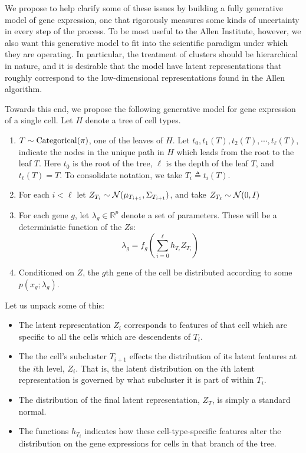 We propose to help clarify some of these issues by building a fully generative model of gene expression, one that rigorously measures some kinds of uncertainty in every step of the process.  To be most useful to the Allen Institute, however, we also want this generative model to fit into the scientific paradigm under which they are operating.  In particular, the treatment of clusters should be hierarchical in nature, and it is desirable that the model have latent representations that roughly correspond to the low-dimensional representations found in the Allen algorithm.  

Towards this end, we propose the following generative model for gene expression of a single cell.  Let $H$ denote a tree of cell types.   

\begin{enumerate}
\item $T \sim \operatorname*{Categorical}(\pi)$, one of the leaves of $H$.  Let $t_0,t_1(T),t_2(T),\cdots ,t_\ell(T)$, indicate the nodes in the unique path in $H$ which leads from the root to the leaf $T$.  Here $t_0$ is the root of the tree, $\ell$ is the depth of the leaf $T$, and $t_\ell(T)=T$.   To consolidate notation, we take $T_i \triangleq t_i(T)$.
\item For each $i<\ell$ let $Z_{T_i} \sim \mathcal{N}(\mu_{T_{i+1}},\Sigma_{T_{i+1}})$, and take $Z_{T_\ell} \sim \mathcal{N}(0,I)$
\item For each gene $g$, let $\lambda_g \in \mathbb R^{p}$ denote a set of parameters.  These will be a deterministic function of the $Z$s:
\[
\lambda_g = f_g \left(\sum_{i=0}^{\ell} h_{T_i}Z_{T_i}\right)
\]
\item Conditioned on $Z$, the  $g$th gene of the cell be distributed according to some $p(x_g ; \lambda_g)$.
\end{enumerate}

Let us unpack some of this:

\begin{itemize}
\item The latent representation $Z_i$ corresponds to features of that cell which are specific to all the cells which are descendents of $T_i$.
\item The the cell's subcluster $T_{i+1}$ effects the distribution of its latent features at the $i$th level, $Z_i$.  That is, the latent distribution on the $i$th latent representation is governed by what subcluster it is part of within $T_i$.
\item The distribution of the final latent representation, $Z_T$, is simply a standard normal.
\item The functions $h_{T_i}$ indicates how these cell-type-specific features alter the distribution on the gene expressions for cells in that branch of the tree.  
\end{itemize}

